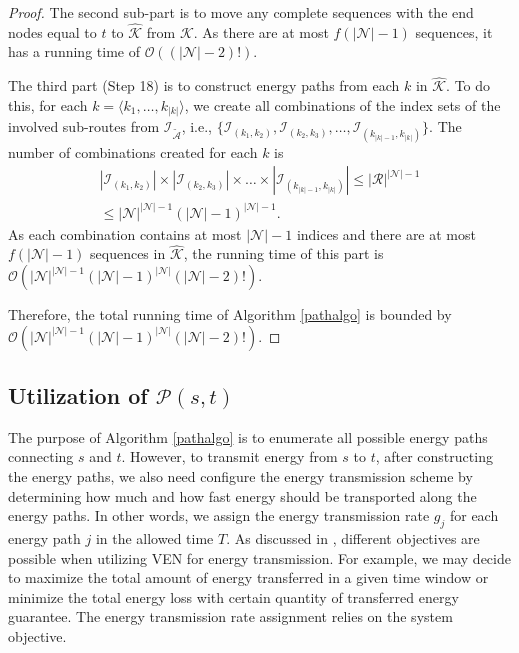 \documentclass[journal]{IEEEtran}
\begin{document}
\begin{proof}
The second sub-part is to move any complete sequences with the end nodes equal to $t$ to $\hat{\mathcal{K}}$ from $\mathcal{K}$. As there are at most $f(|\mathcal{N}|-1)$ sequences, it has a running time of $\mathcal{O}((|\mathcal{N}|-2)!)$.

The third part (Step 18) is to construct energy paths from each $k$ in $\hat{\mathcal{K}}$. To do this, for each $k=\langle k_1,\ldots,k_{|k|}\rangle$, we create all combinations of the index sets of the involved sub-routes from $\mathcal{I}_{\tilde{\mathcal{A}}}$, i.e., $\{\mathcal{I}_{(k_1,k_2)},\mathcal{I}_{(k_2,k_3)},\ldots,\mathcal{I}_{(k_{|k|-1},k_{|k|})} \}$. The number of combinations created for each $k$ is 
\begin{align*}
|\mathcal{I}_{(k_1,k_2)}|\times|\mathcal{I}_{(k_2,k_3)}|\times \ldots \times |\mathcal{I}_{(k_{|k|-1},k_{|k|})}| \leq |\mathcal{R}|^{|\mathcal{N}|-1}\\
\leq |\mathcal{N}|^{|\mathcal{N}|-1}(|\mathcal{N}|-1)^{|\mathcal{N}|-1}.
\end{align*}
As each combination contains at most $|\mathcal{N}|-1$ indices and there are at most $f(|\mathcal{N}|-1)$ sequences in $\hat{\mathcal{K}}$, the running time of this part is $\mathcal{O}(|\mathcal{N}|^{|\mathcal{N}|-1}(|\mathcal{N}|-1)^{|\mathcal{N}|}(|\mathcal{N}|-2)!)$.

Therefore, the total running time of Algorithm \ref{pathalgo} is bounded by $\mathcal{O}(|\mathcal{N}|^{|\mathcal{N}|-1}(|\mathcal{N}|-1)^{|\mathcal{N}|}(|\mathcal{N}|-2)!)$.
\end{proof}

\subsection{Utilization of $\mathcal{P}(s,t)$} \label{subsec:optimization}

The purpose of Algorithm \ref {pathalgo} is to enumerate all possible energy paths connecting $s$ and $t$. However,
to transmit energy from $s$ to $t$, after constructing the energy paths, we also need configure the energy transmission scheme by determining how much and how fast energy should be transported along the energy paths. In other words, we assign the energy transmission rate $g_j$ for each energy path $j$ in the allowed time $T$. 
As discussed in \cite{VEN}, different objectives are possible when utilizing VEN for energy transmission. For example, we may decide to maximize the total amount of energy transferred in a given time window or minimize the total energy loss with certain quantity of transferred energy guarantee. The energy transmission rate assignment relies on the system objective. 
\end{document}
